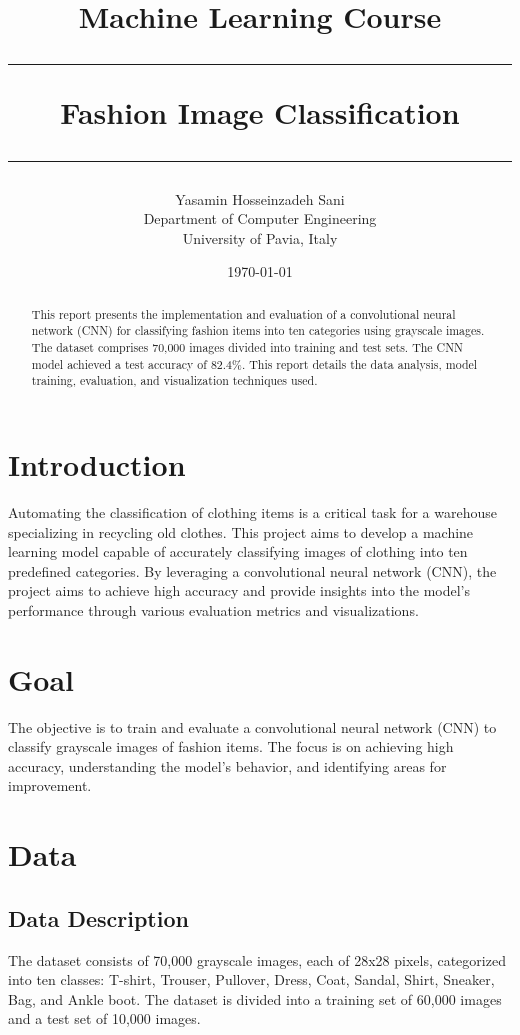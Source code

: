 \documentclass[a4paper,10pt]{article}
\title{\vspace{40mm}\Large {Machine Learning Course} \vspace{0.2cm}
     \rule{\textwidth}{0.3pt} \vspace{0.1cm} %
     \textbf{Fashion Image Classification} \vspace{0.0cm} %
     \rule{\textwidth}{0.3pt}}
\author{ Yasamin Hosseinzadeh Sani \vspace{0.1cm}\\
        \small Department of Computer Engineering\vspace{0.2cm}\\
        \small University of Pavia, Italy \vspace{0.2cm}\\
        }
\date{\today}
\begin{document}
\maketitle
\vspace{110mm}

\begin{abstract}
This report presents the implementation and evaluation of a convolutional neural network (CNN) for classifying fashion items into ten categories using grayscale images. The dataset comprises 70,000 images divided into training and test sets. The CNN model achieved a test accuracy of 82.4\%. This report details the data analysis, model training, evaluation, and visualization techniques used.
\end{abstract}

\tableofcontents

\section{Introduction}
Automating the classification of clothing items is a critical task for a warehouse specializing in recycling old clothes. This project aims to develop a machine learning model capable of accurately classifying images of clothing into ten predefined categories. By leveraging a convolutional neural network (CNN), the project aims to achieve high accuracy and provide insights into the model's performance through various evaluation metrics and visualizations.

\section{Goal}
The objective is to train and evaluate a convolutional neural network (CNN) to classify grayscale images of fashion items. The focus is on achieving high accuracy, understanding the model's behavior, and identifying areas for improvement.

\section{Data}

\subsection{Data Description}
The dataset consists of 70,000 grayscale images, each of 28x28 pixels, categorized into ten classes: T-shirt, Trouser, Pullover, Dress, Coat, Sandal, Shirt, Sneaker, Bag, and Ankle boot. The dataset is divided into a training set of 60,000 images and a test set of 10,000 images.
\end{document}
